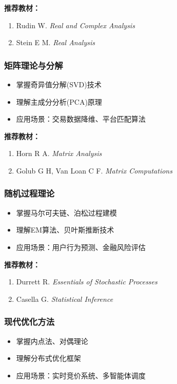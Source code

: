 \documentclass[lang=cn,12pt,a4paper]{elegantpaper}
\begin{document}
\noindent \textbf{推荐教材：}
\begin{enumerate}[leftmargin=*,nosep]
    \item Rudin W. \textit{Real and Complex Analysis}
    \item Stein E M. \textit{Real Analysis}
\end{enumerate}

\subsubsection{矩阵理论与分解}
\begin{itemize}[leftmargin=*,noitemsep]
    \item 掌握奇异值分解(SVD)技术
    \item 理解主成分分析(PCA)原理
    \item 应用场景：交易数据降维、平台匹配算法
\end{itemize}

\noindent \textbf{推荐教材：}
\begin{enumerate}[leftmargin=*,nosep]
    \item Horn R A. \textit{Matrix Analysis}
    \item Golub G H, Van Loan C F. \textit{Matrix Computations}
\end{enumerate}

\subsubsection{随机过程理论}
\begin{itemize}[leftmargin=*,noitemsep]
    \item 掌握马尔可夫链、泊松过程建模
    \item 理解EM算法、贝叶斯推断技术
    \item 应用场景：用户行为预测、金融风险评估
\end{itemize}

\noindent \textbf{推荐教材：}
\begin{enumerate}[leftmargin=*,nosep]
    \item Durrett R. \textit{Essentials of Stochastic Processes}
    \item Casella G. \textit{Statistical Inference}
\end{enumerate}

\subsubsection{现代优化方法}
\begin{itemize}[leftmargin=*,noitemsep]
    \item 掌握内点法、对偶理论
    \item 理解分布式优化框架
    \item 应用场景：实时竞价系统、多智能体调度
\end{itemize}
\end{document}
